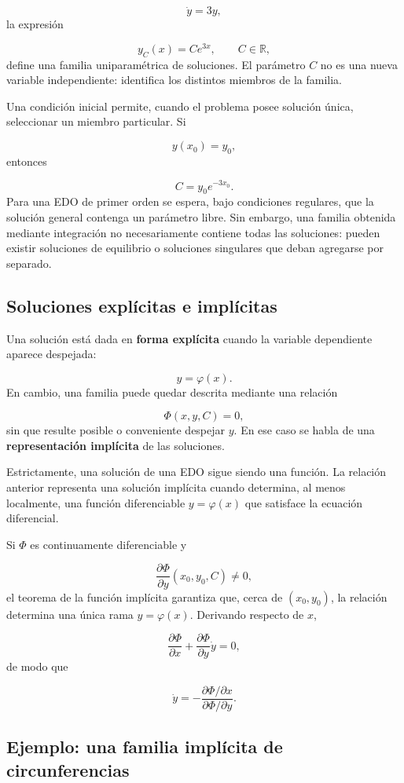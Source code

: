\documentclass[12pt,a4paper]{article}
\begin{document}
	\[
	\dot{y}=3y,
	\]
la expresión

	\[
	y_C(x)=Ce^{3x},
	\qquad C\in\mathbb{R},
	\]
define una familia uniparamétrica de soluciones. El parámetro $C$ no es una nueva variable independiente: identifica los distintos miembros de la familia.

	Una condición inicial permite, cuando el problema posee solución única, seleccionar un miembro particular. Si

	\[
	y(x_0)=y_0,
	\]
entonces

	\[
	C=y_0e^{-3x_0}.
	\]
Para una EDO de primer orden se espera, bajo condiciones regulares, que la solución general contenga un parámetro libre. Sin embargo, una familia obtenida mediante integración no necesariamente contiene todas las soluciones: pueden existir soluciones de equilibrio o soluciones singulares que deban agregarse por separado.

	\subsection{Soluciones explícitas e implícitas}

	Una solución está dada en \textbf{forma explícita} cuando la variable dependiente aparece despejada:

	\[
	y=\varphi(x).
	\]
	En cambio, una familia puede quedar descrita mediante una relación

	\[
	\Phi(x,y,C)=0,
	\]
sin que resulte posible o conveniente despejar $y$. En ese caso se habla de una \textbf{representación implícita} de las soluciones.

	Estrictamente, una solución de una EDO sigue siendo una función. La relación anterior representa una solución implícita cuando determina, al menos localmente, una función diferenciable $y=\varphi(x)$ que satisface la ecuación diferencial.

	Si $\Phi$ es continuamente diferenciable y

	\[
	\frac{\partial\Phi}{\partial y}(x_0,y_0,C)\neq 0,
	\]
el teorema de la función implícita garantiza que, cerca de $(x_0,y_0)$, la relación determina una única rama $y=\varphi(x)$. Derivando respecto de $x$,

	\[
	\frac{\partial\Phi}{\partial x}
	+
	\frac{\partial\Phi}{\partial y}\dot{y}
	=0,
	\]
de modo que

	\[
	\dot{y}
	=
	-\frac{\partial\Phi/\partial x}{\partial\Phi/\partial y}.
	\]

	\subsection{Ejemplo: una familia implícita de circunferencias}
\end{document}
